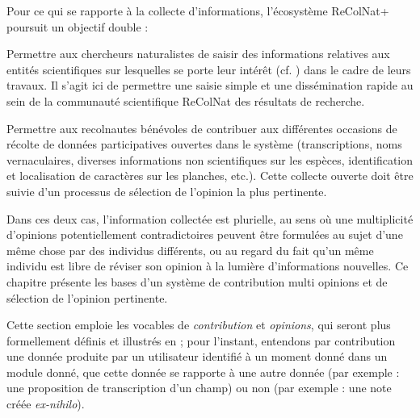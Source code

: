 \startchapter[title={Opinions & autorité}]

\startsection[title={Enjeux}]

Pour ce qui se rapporte à la collecte d'informations, l'écosystème ReColNat+ poursuit un objectif double :

\startitemize
	\item
	Permettre aux chercheurs naturalistes de saisir des informations relatives aux entités scientifiques sur lesquelles se porte leur intérêt (cf. ) dans le cadre de leurs travaux.
	Il s'agit ici de permettre une saisie simple et une dissémination rapide au sein de la communauté scientifique ReColNat des résultats de recherche.
	\item
	Permettre aux recolnautes bénévoles de contribuer aux différentes occasions de récolte de données participatives ouvertes dans le système (transcriptions, noms vernaculaires, diverses informations non scientifiques sur les espèces, identification et localisation de caractères sur les planches, etc.).
	Cette collecte ouverte doit être suivie d'un processus de sélection de l'opinion la plus pertinente.
\stopitemize

Dans ces deux cas, l'information collectée est plurielle, au sens où une multiplicité d'opinions potentiellement contradictoires peuvent être formulées au sujet d'une même chose par des individus différents, ou au regard du fait qu'un même individu est libre de réviser son opinion à la lumière d'informations nouvelles.
Ce chapitre présente les bases d'un système de contribution multi opinions et de sélection de l'opinion pertinente.

\startsection[title={Exigences}]

Cette section emploie les vocables de {\em contribution} et {\em opinions}, qui seront plus formellement définis et illustrés en  ; pour l'instant, entendons par contribution une donnée produite par un utilisateur identifié à un moment donné dans un module donné, que cette donnée se rapporte à une autre donnée (par exemple : une proposition de transcription d'un champ) ou non (par exemple : une note créée {\it ex-nihilo}).

